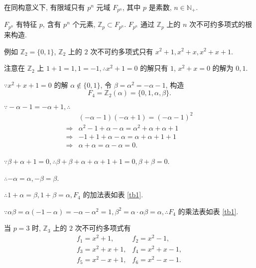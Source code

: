 \documentclass{ctexart}
\begin{document}
\begin{example}\label{exp3.6}
    在同构意义下, 有限域只有 $p^n$ 元域 $F_{p^n}$, 其中 $p$ 是素数, $n\in\mathbb{N}_+$.

    $F_{p^n}$ 有特征 $p$, 含有 $p^n$ 个元素, $\mathbb{Z}_p\subset F_{p^n}$. $F_{p^n}$ 通过 $\mathbb{Z}_p$ 上的 $n$ 次不可约多项式的根来构造.

    例如 $\mathbb{Z}_2=\{0,1\}$, $\mathbb{Z}_2$ 上的 $2$ 次不可约多项式只有 $x^2+1,x^2+x,x^2+x+1$.

    注意在 $\mathbb{Z}_2$ 上 $1+1=1,1=-1,\therefore x^2+1=0$ 的解只有 $1$, $x^2+x=0$ 的解为 $0,1$.

    $\because x^2+x+1=0$ 的解 $\alpha\notin\{0,1\}$, 令 $\beta=\alpha^2=-\alpha-1$, 构造
    \[F_4=\mathbb{Z}_2(\alpha)=\{0,1,\alpha,\beta\}.\]
    
    $\because-\alpha-1=-\alpha+1,\therefore$
    \begin{align*}
        & (-\alpha-1)(-\alpha+1)=(-\alpha-1)^2 \\
        \Rightarrow & \alpha^2-1+\alpha-\alpha=\alpha^2+\alpha+\alpha+1 \\
        \Rightarrow & -1+1+\alpha-\alpha=\alpha+\alpha+1+1 \\
        \Rightarrow & \alpha+\alpha=\alpha-\alpha=0.
    \end{align*}

    $\because\beta+\alpha+1=0,\therefore\beta+\beta+\alpha+\alpha+1+1=0,\beta+\beta=0$.

    $\therefore-\alpha=\alpha,-\beta=\beta$.
    
    $\therefore1+\alpha=\beta,1+\beta=\alpha,F_4$ 的加法表如表 \ref{tb1}.

    $\because\alpha\beta=\alpha(-1-\alpha)=-\alpha-\alpha^2=1,\beta^2=\alpha\cdot\alpha\beta=\alpha,\therefore F_4$ 的乘法表如表 \ref{tb1}.

    当 $p=3$ 时, $\mathbb{Z}_3$ 上的 $2$ 次不可约多项式有
    \[\begin{array}{ll}
        f_1=x^2+1, & f_2=x^2-1, \\
        f_3=x^2+x+1, & f_4=x^2+x-1, \\
        f_5=x^2-x+1, & f_6=x^2-x-1. \\
    \end{array}\]


\end{example}
\end{document}
